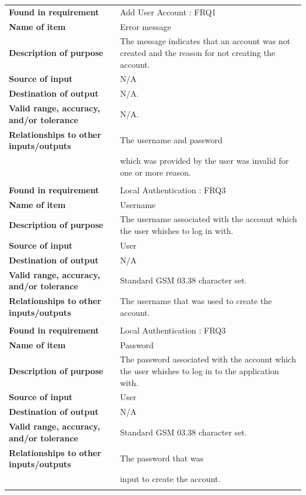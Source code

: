 \begin{tabular}{ll}
\textbf{Found in requirement}&Add User Account : FRQ1\\
\textbf{Name of item}&Error message\\
\textbf{Description of purpose}&The message indicates that an account was not created and the reason for not creating the account.\\
\textbf{Source of input}&N/A\\
\textbf{Destination of output}&N/A.\\
\textbf{Valid range, accuracy, and/or tolerance}&N/A.\\
\textbf{Relationships to other inputs/outputs}&The username and password \\&which was provided by the user was invalid for one or more reason.\\
&\\
\textbf{Found in requirement}&Local Authentication : FRQ3\\
\textbf{Name of item}&Username\\
\textbf{Description of purpose}&The username associated with the account which the user whishes to log in with.\\
\textbf{Source of input}&User\\
\textbf{Destination of output}&N/A\\
\textbf{Valid range, accuracy, and/or tolerance}&Standard GSM 03.38 character set.\\
\textbf{Relationships to other inputs/outputs}&The username that was used to create the account.\\
&\\
\textbf{Found in requirement}&Local Authentication : FRQ3\\
\textbf{Name of item}&Password\\
\textbf{Description of purpose}&The password associated with the account which the user whishes to log in to the application with.\\
\textbf{Source of input}&User\\
\textbf{Destination of output}&N/A\\
\textbf{Valid range, accuracy, and/or tolerance}&Standard GSM 03.38 character set.\\
\textbf{Relationships to other inputs/outputs}&The password that was \\&input to create the account.\\
&\\
\end{tabular}
